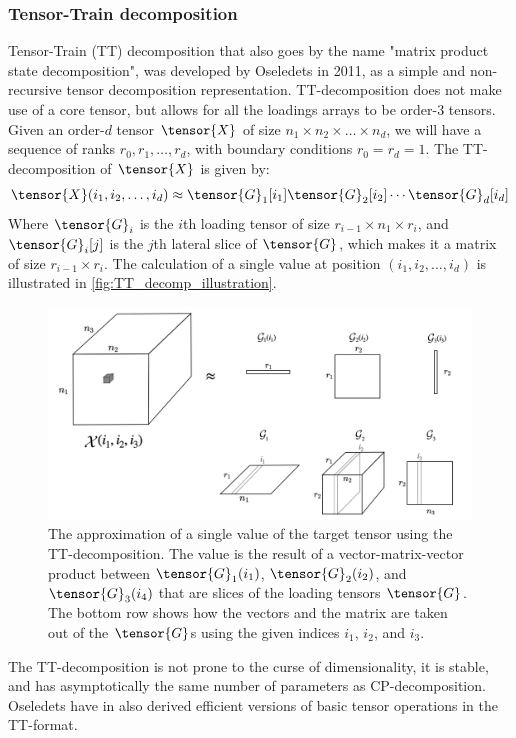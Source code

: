 \subsubsection{Tensor-Train decomposition}
Tensor-Train (TT) decomposition that also goes by the name "matrix product state decomposition", was developed by Oseledets in 2011, as a simple and non-recursive tensor decomposition representation.\cite{Oseledets2011} TT-decomposition does not make use of a core tensor, but allows for all the loadings arrays to be order-3 tensors. Given an order-$d$ tensor $\tensor{X}$ of size $n_1\times n_2 \times \dots \times n_d$, we will have a sequence of ranks $r_0, r_1, \dots, r_d$, with boundary conditions $r_0=r_d=1$. The TT-decomposition of $\tensor{X}$ is given by:
\begin{equation}
    \tensor{X}(i_1, i_2, \dots, i_d) \approx \tensor{G}_1[i_1] \tensor{G}_2[i_2] \cdots \tensor{G}_d[i_d]
\end{equation}
Where $\tensor{G}_i$ is the $i$th loading tensor of size $r_{i-1}\times n_1\times r_i$, and $\tensor{G}_i[j]$ is the $j$th lateral slice of $\tensor{G}$, which makes it a matrix of size $r_{i-1}\times r_i$. The calculation of a single value at position $(i_1, i_2, \dots, i_d)$ is illustrated in \autoref{fig:TT_decomp_illustration}.
\begin{figure}
    \centering
    \captionsetup{width=.95\linewidth}
    \includegraphics[width=.9\linewidth]{Pics/02_Theory/TT_decomp_illustration.png}
    \caption{The approximation of a single value of the target tensor using the TT-decomposition. The value is the result of a vector-matrix-vector product between $\tensor{G}_1(i_1)$, $\tensor{G}_2(i_2)$, and $\tensor{G}_3(i_4)$ that are slices of the loading tensors $\tensor{G}$. The bottom row shows how the vectors and the matrix are taken out of the $\tensor{G}$s using the given indices $i_1$, $i_2$, and $i_3$.}
    \label{fig:TT_decomp_illustration}
\end{figure}

The TT-decomposition is not prone to the curse of dimensionality, it is stable, and has asymptotically the same number of parameters as CP-decomposition. Oseledets have in \cite{Oseledets2011} also derived efficient versions of basic tensor operations in the TT-format.